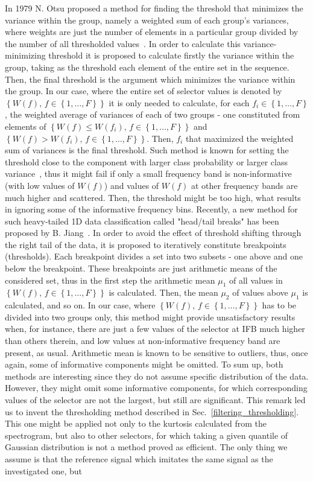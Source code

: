 In 1979 N. Otsu proposed a method for finding the threshold that minimizes the variance within the group, namely a weighted sum of each group's variances, where weights are just the number of elements in a particular group divided by the number of all thresholded values~\cite{Otsu197962}. In order to calculate this variance-minimizing threshold it is proposed to calculate firstly the variance within the group, taking as the threshold each element of the entire set in the sequence. Then, the final threshold is the argument which minimizes the variance within the group. In our case, where the entire set of selector values is denoted by $\left\{W(f),\,f\in \left\{ 1,\ldots,F\right\}\right\}$ it is only needed to calculate, for each $f_i\in \left\{ 1,\ldots,F\right\}$, the weighted average of variances of each of two groups - one constituted from elements of $\left\{W(f)\leq W\left(f_i\right),\,f\in \left\{ 1,\ldots,F\right\}\right\}$  and $\left\{W(f) > W\left(f_i\right),\,f\in \left\{ 1,\ldots,F\right\}\right\}$. Then, $f_i$ that maximized the weighted sum of variances is the final threshold. Such method is known for setting the threshold close to the component with larger class probability or larger class variance~\cite{Hou20061732}, thus it might fail if only a small frequency band is non-informative (with low values of $W(f)$) and values of $W(f)$ at other frequency bands are much higher and scattered. Then, the threshold might be too high, what results in ignoring some of the informative frequency bins. Recently, a new method for such heavy-tailed 1D data classification called "head/tail breaks" has been proposed by B. Jiang~\cite{Jiang2013482}. In order to avoid the effect of threshold shifting through the right tail of the data, it is proposed to iteratively constitute breakpoints (thresholds). Each breakpoint divides a set into two subsets - one above and one below the breakpoint. These breakpoints are just arithmetic means of the considered set, thus in the first step the arithmetic mean $\mu_1$ of all values in $\left\{W(f),\,f\in \left\{ 1,\ldots,F\right\}\right\}$ is calculated. Then, the mean $\mu_2$ of values above $\mu_1$ is calculated, and so on. In our case, where $\left\{W(f),\,f\in \left\{ 1,\ldots,F\right\}\right\}$ has to be divided into two groups only, this method might provide unsatisfactory results when, for instance, there are just a few values of the selector at IFB much higher than others therein, and low values at non-informative frequency band are present, as usual. Arithmetic mean is known to be sensitive to outliers, thus, once again, some of informative components might be omitted. To sum up, both methods are interesting since they do not assume specific distribution of the data. However, they might omit some informative components, for which corresponding values of the selector are not the largest, but still are significant. This remark led us to invent the thresholding method described in Sec.~\ref{filtering_thresholding}. This one might be applied not only to the kurtosis calculated from the spectrogram, but also to other selectors, for which taking a given quantile of Gaussian distribution is not a method proved as efficient. The only thing we assume is that the reference signal which imitates the same signal as the investigated one, but 